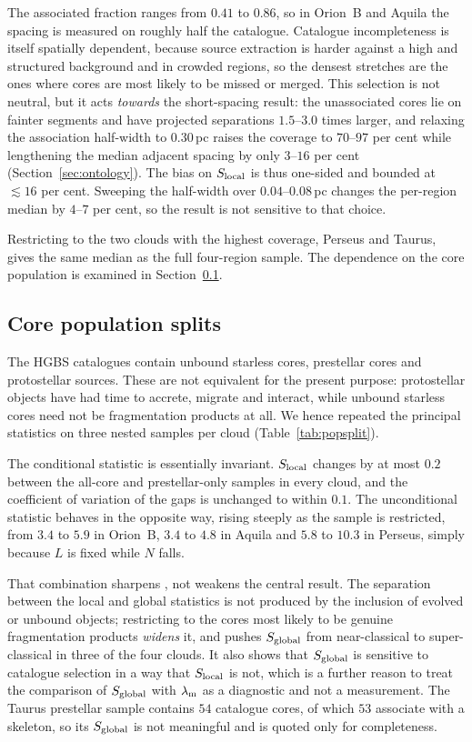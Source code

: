 \documentclass[usenatbib,twoside,twocolumn]{mnras}
\begin{document}
The associated fraction ranges from $0.41$ to $0.86$, so in Orion~B and Aquila the spacing is measured on roughly half the catalogue. Catalogue incompleteness is itself spatially dependent, because source extraction is harder against a high and structured background and in crowded regions, so the densest stretches are the ones where cores are most likely to be missed or merged. This selection is not neutral, but it acts \emph{towards} the short-spacing result: the unassociated cores lie on fainter segments and have projected separations $1.5$--$3.0$ times larger, and relaxing the association half-width to $0.30$\,pc raises the coverage to $70$--$97$ per cent while lengthening the median adjacent spacing by only $3$--$16$ per cent (Section~\ref{sec:ontology}). The bias on $S_{\rm local}$ is thus one-sided and bounded at $\lesssim16$ per cent. Sweeping the half-width over $0.04$--$0.08$\,pc changes the per-region median by $4$--$7$ per cent, so the result is not sensitive to that choice.

Restricting to the two clouds with the highest coverage, Perseus and Taurus, gives the same median as the full four-region sample. The dependence on the core population is examined in Section~\ref{sec:popsplit}.


\subsection{Core population splits}
\label{sec:popsplit}

The HGBS catalogues contain unbound starless cores, prestellar cores and protostellar sources. These are not equivalent for the present purpose: protostellar objects have had time to accrete, migrate and interact, while unbound starless cores need not be fragmentation products at all. We hence repeated the principal statistics on three nested samples per cloud (Table~\ref{tab:popsplit}).

The conditional statistic is essentially invariant. $S_{\rm local}$ changes by at most $0.2$ between the all-core and prestellar-only samples in every cloud, and the coefficient of variation of the gaps is unchanged to within $0.1$. The unconditional statistic behaves in the opposite way, rising steeply as the sample is restricted, from $3.4$ to $5.9$ in Orion~B, $3.4$ to $4.8$ in Aquila and $5.8$ to $10.3$ in Perseus, simply because $L$ is fixed while $N$ falls.

That combination sharpens , not weakens the central result. The separation between the local and global statistics is not produced by the inclusion of evolved or unbound objects; restricting to the cores most likely to be genuine fragmentation products \emph{widens} it, and pushes $S_{\rm global}$ from near-classical to super-classical in three of the four clouds. It also shows that $S_{\rm global}$ is sensitive to catalogue selection in a way that $S_{\rm local}$ is not, which is a further reason to treat the comparison of $S_{\rm global}$ with $\lambda_{\rm m}$ as a diagnostic and not a measurement. The Taurus prestellar sample contains $54$ catalogue cores, of which $53$ associate with a skeleton, so its $S_{\rm global}$ is not meaningful and is quoted only for completeness.
\end{document}
